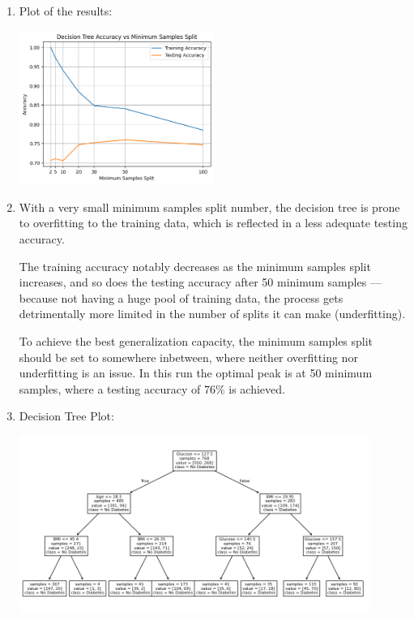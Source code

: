 \documentclass{article}
\begin{document}
\begin{enumerate}[leftmargin=\labelsep]
\vfill

\item Plot of the results:
\begin{center}
    \includegraphics[width=0.5\textwidth]{img/tree_acc_vs_split.png} 
\end{center}

\vfill

\item With a very small minimum samples split number, the decision
tree is prone to overfitting to the training data, which is reflected
in a less adequate testing accuracy.

The training accuracy notably decreases as the minimum samples
split increases, and so does the testing accuracy after 50 minimum
samples --- because not having a huge pool of training data,
the process gets detrimentally more limited in the number of splits
it can make (underfitting).

To achieve the best generalization capacity, the minimum samples
split should be set to somewhere inbetween, where neither overfitting
nor underfitting is an issue. In this run the optimal peak is at 50 
minimum samples, where a testing accuracy of 76\% is achieved.

\vfill
\newpage

\item Decision Tree Plot:
    \begin{center}
        \includegraphics[width=0.9\textwidth]{img/tree_plot.png} 
    \end{center}


\end{enumerate}
\end{document}

